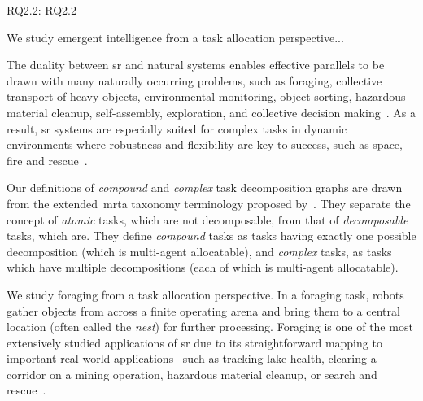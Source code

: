 \noindent
\gls{RQ2.2}: \glsdesc{RQ2.2}

We study emergent intelligence from a task allocation perspective...


The duality between \gls{sr} and natural systems enables effective parallels to
be drawn with many naturally occurring problems, such as foraging, collective
transport of heavy objects, environmental monitoring, object sorting, hazardous
material cleanup, self-assembly, exploration, and collective decision
making~\cite{Hecker2015,Kumar2003,CarrilloZapata2020}.  As a result, \gls{sr}
systems are especially suited for complex tasks in dynamic environments where
robustness and flexibility are key to success, such as space, fire and
rescue~\cite{Rouff2004,CarrilloZapata2020}.

%
Our definitions of \emph{compound} and \emph{complex} task decomposition graphs
are drawn from the extended~\gls{mrta} taxonomy terminology proposed
by~\cite{Korsah2013}. They separate the concept of \emph{atomic} tasks, which
are not decomposable, from that of \emph{decomposable} tasks, which are. They
define \emph{compound} tasks as tasks having exactly one possible decomposition
(which is multi-agent allocatable), and \emph{complex} tasks, as tasks which
have multiple decompositions (each of which is multi-agent allocatable).


We study foraging from a task allocation perspective. In a foraging task, robots
gather objects from across a finite operating arena and bring them to a central
location (often called the \emph{nest}) for further processing. Foraging is one
of the most extensively studied applications of \gls{sr} due to its
straightforward mapping to important real-world applications~\cite{Hecker2015}
such as tracking lake health, clearing a corridor on a mining operation,
hazardous material cleanup, or search and
rescue~\cite{Sahin2005,Hecker2015,Labella}. 



